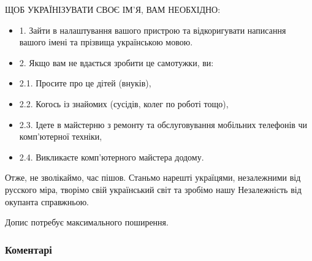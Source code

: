 ЩОБ УКРАЇНІЗУВАТИ СВОЄ ІМ'Я, ВАМ НЕОБХІДНО:

\begin{itemize}
  \item 1. Зайти в налаштування вашого пристрою та відкоригувати написання вашого імені та прізвища українською мовою. 
  \item 2. Якщо вам не вдається зробити це самотужки, ви:
  \item 2.1. Просите про це дітей (внуків), 
  \item 2.2. Когось із знайомих (сусідів, колег по роботі тощо), 
  \item 2.3. Ідете в майстерню з ремонту та обслуговування мобільних телефонів чи комп'ютерної техніки,
  \item 2.4. Викликаєте комп'ютерного майстера додому. 
\end{itemize}

Отже, не зволікаймо, час пішов. Станьмо нарешті україцями, незалежними від
русского міра, творімо свій український світ та зробімо нашу Незалежність від
окупанта справжньою. 

Допис потребує максимального поширення.

\subsubsection{Коментарі}

